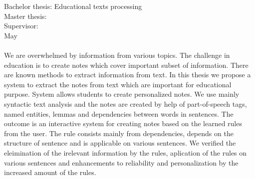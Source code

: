 {
	{Bachelor thesis: Educational texts processing} \\
}
{
	{Master thesis: }\Title \\
}
Supervisor: \Supervisor \\
May \Year \\
\noindent
\\
We are overwhelmed by information from various topics. The challenge in education is to create notes which cover important subset of information. There are known methods to extract information from text. In this thesis we propose a system to extract the notes from text which are important for educational purpose. System allows students to create personalized notes. We use mainly syntactic text analysis and the notes are created by help of part-of-speech tags, named entities, lemmas and dependencies between words in sentences. The outcome is an interactive system for creating notes based on the learned rules from the user. The rule consists mainly from dependencies, depends on the structure of sentence and is applicable on various sentences. We verified the eleimination of the irelevant information by the rules, aplication of the rules on various sentences and enhancements to reliability and personalization by the increased amount of the rules.